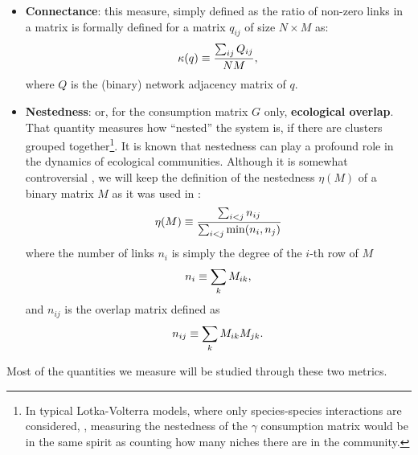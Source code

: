\documentclass[12pt, titlepage]{report}
\begin{document}
\begin{itemize}
\item \textbf{Connectance}: this measure, simply defined as the ratio of non-zero links in a matrix %
is formally defined for a matrix $q_{ij}$  of size $N\times M$ as:
\begin{equation}
\kappa(q)\equiv \frac{\sum_{ij} Q_{ij}}{NM},
\end{equation}
where $Q$ is the (binary) network adjacency matrix of $q$.


\item \textbf{Nestedness}: or, for the consumption matrix $G$ only, \textbf{ecological overlap}. That quantity measures how ``nested'' the system is, \ie if there are clusters grouped together\footnote{In typical Lotka-Volterra models, where only species-species interactions are considered, \eg \cite{iannelli_introduction_2014}, measuring the nestedness of the $\gamma$ consumption matrix would be in the same spirit as counting how many niches there are in the community.}. It is known \cite{bastolla_architecture_2009, pascual-garcia_mutualism_2017} that nestedness can play a profound role in the dynamics of ecological communities. Although it is somewhat controversial \cite{jonhson_factors_2013}, we will keep the definition of the nestedness $\eta(M)$ of a binary matrix $M$ as it was used in \cite{bastolla_architecture_2009}:
\begin{equation}
\eta(M)\equiv \frac{\sum_{i<j} n_{ij}}{\sum_{i < j} \min(n_i, n_j)}
\end{equation}
where the number of links $n_i$ is simply the degree of the $i$-th row of $M$
\begin{equation}
n_i \equiv \sum_k M_{ik},
\end{equation}
and $n_{ij}$ is the overlap matrix defined as
\begin{equation}
n_{ij}\equiv \sum_k M_{ik}M_{jk}.
\end{equation}
\end{itemize}
Most of the quantities we measure will be studied through these two metrics.
\end{document}
